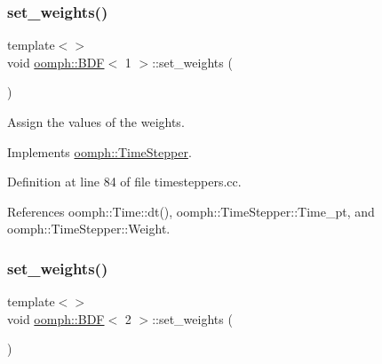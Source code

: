 \mbox{\label{classoomph_1_1BDF_aacecf959d3e27e8f361764b43e4c1612}} 
\subsubsection{\texorpdfstring{set\+\_\+weights()}{set\_weights()}\hspace{0.1cm}{\footnotesize\ttfamily [1/4]}}
{\footnotesize\ttfamily template$<$$>$ \\
void \hyperlink{classoomph_1_1BDF}{oomph\+::\+B\+DF}$<$ 1 $>$\+::set\+\_\+weights (\begin{DoxyParamCaption}{ }\end{DoxyParamCaption})\hspace{0.3cm}{\ttfamily [virtual]}}



Assign the values of the weights. 



Implements \hyperlink{classoomph_1_1TimeStepper_a028fa3a8d3c6db6b0ddf580cb0468d55}{oomph\+::\+Time\+Stepper}.



Definition at line 84 of file timesteppers.\+cc.



References oomph\+::\+Time\+::dt(), oomph\+::\+Time\+Stepper\+::\+Time\+\_\+pt, and oomph\+::\+Time\+Stepper\+::\+Weight.

\mbox{\label{classoomph_1_1BDF_acc878d9a57bf6a68478558e89e6408c9}} 
\subsubsection{\texorpdfstring{set\+\_\+weights()}{set\_weights()}\hspace{0.1cm}{\footnotesize\ttfamily [2/4]}}
{\footnotesize\ttfamily template$<$$>$ \\
void \hyperlink{classoomph_1_1BDF}{oomph\+::\+B\+DF}$<$ 2 $>$\+::set\+\_\+weights (\begin{DoxyParamCaption}{ }\end{DoxyParamCaption})\hspace{0.3cm}{\ttfamily [virtual]}}

